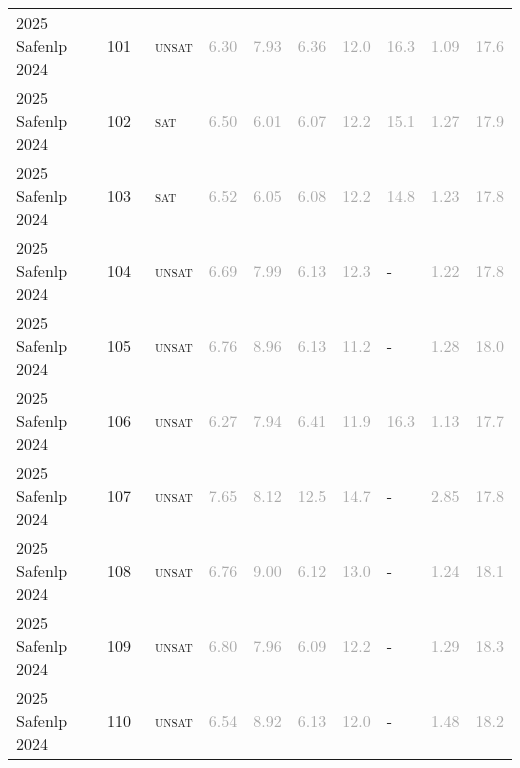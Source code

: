 \begin{center}
{\begin{longtable}{@{}llllllllll@{}}
2025 Safenlp 2024 & 101 & ~\textsc{unsat} & \textcolor{darkgray}{6.30} & \textcolor{darkgray}{7.93} & \textcolor{darkgray}{6.36} & \textcolor{darkgray}{12.0} & \textcolor{darkgray}{16.3} & \textcolor{darkgray}{1.09} & \textcolor{darkgray}{17.6} \\
2025 Safenlp 2024 & 102 & ~\textsc{sat} & \textcolor{darkgray}{6.50} & \textcolor{darkgray}{6.01} & \textcolor{darkgray}{6.07} & \textcolor{darkgray}{12.2} & \textcolor{darkgray}{15.1} & \textcolor{darkgray}{1.27} & \textcolor{darkgray}{17.9} \\
2025 Safenlp 2024 & 103 & ~\textsc{sat} & \textcolor{darkgray}{6.52} & \textcolor{darkgray}{6.05} & \textcolor{darkgray}{6.08} & \textcolor{darkgray}{12.2} & \textcolor{darkgray}{14.8} & \textcolor{darkgray}{1.23} & \textcolor{darkgray}{17.8} \\
2025 Safenlp 2024 & 104 & ~\textsc{unsat} & \textcolor{darkgray}{6.69} & \textcolor{darkgray}{7.99} & \textcolor{darkgray}{6.13} & \textcolor{darkgray}{12.3} & - & \textcolor{darkgray}{1.22} & \textcolor{darkgray}{17.8} \\
2025 Safenlp 2024 & 105 & ~\textsc{unsat} & \textcolor{darkgray}{6.76} & \textcolor{darkgray}{8.96} & \textcolor{darkgray}{6.13} & \textcolor{darkgray}{11.2} & - & \textcolor{darkgray}{1.28} & \textcolor{darkgray}{18.0} \\
2025 Safenlp 2024 & 106 & ~\textsc{unsat} & \textcolor{darkgray}{6.27} & \textcolor{darkgray}{7.94} & \textcolor{darkgray}{6.41} & \textcolor{darkgray}{11.9} & \textcolor{darkgray}{16.3} & \textcolor{darkgray}{1.13} & \textcolor{darkgray}{17.7} \\
2025 Safenlp 2024 & 107 & ~\textsc{unsat} & \textcolor{darkgray}{7.65} & \textcolor{darkgray}{8.12} & \textcolor{darkgray}{12.5} & \textcolor{darkgray}{14.7} & - & \textcolor{darkgray}{2.85} & \textcolor{darkgray}{17.8} \\
2025 Safenlp 2024 & 108 & ~\textsc{unsat} & \textcolor{darkgray}{6.76} & \textcolor{darkgray}{9.00} & \textcolor{darkgray}{6.12} & \textcolor{darkgray}{13.0} & - & \textcolor{darkgray}{1.24} & \textcolor{darkgray}{18.1} \\
2025 Safenlp 2024 & 109 & ~\textsc{unsat} & \textcolor{darkgray}{6.80} & \textcolor{darkgray}{7.96} & \textcolor{darkgray}{6.09} & \textcolor{darkgray}{12.2} & - & \textcolor{darkgray}{1.29} & \textcolor{darkgray}{18.3} \\
2025 Safenlp 2024 & 110 & ~\textsc{unsat} & \textcolor{darkgray}{6.54} & \textcolor{darkgray}{8.92} & \textcolor{darkgray}{6.13} & \textcolor{darkgray}{12.0} & - & \textcolor{darkgray}{1.48} & \textcolor{darkgray}{18.2} \\

\end{longtable}}
\end{center}
